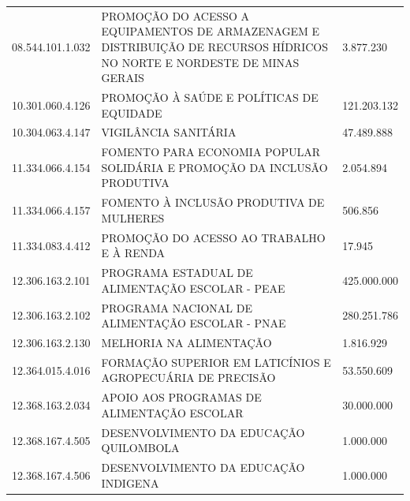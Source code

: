 \documentclass{article}
\begin{document}
\begin{longtable}[c]{m{3cm}|m{12cm}|m{2cm}}
\multicolumn{1}{C{3cm}|}{08.544.101.1.032} & \multicolumn{1}{L{12cm}|}{PROMOÇÃO DO ACESSO A EQUIPAMENTOS DE ARMAZENAGEM E DISTRIBUIÇÃO DE RECURSOS HÍDRICOS NO NORTE E NORDESTE DE MINAS GERAIS} & \multicolumn{1}{R{2cm}}{3.877.230} \\
\multicolumn{1}{C{3cm}|}{10.301.060.4.126} & \multicolumn{1}{L{12cm}|}{PROMOÇÃO À SAÚDE E POLÍTICAS DE EQUIDADE} & \multicolumn{1}{R{2cm}}{121.203.132} \\
\multicolumn{1}{C{3cm}|}{10.304.063.4.147} & \multicolumn{1}{L{12cm}|}{VIGILÂNCIA SANITÁRIA} & \multicolumn{1}{R{2cm}}{47.489.888} \\
\multicolumn{1}{C{3cm}|}{11.334.066.4.154} & \multicolumn{1}{L{12cm}|}{FOMENTO PARA ECONOMIA POPULAR SOLIDÁRIA E PROMOÇÃO DA INCLUSÃO PRODUTIVA} & \multicolumn{1}{R{2cm}}{2.054.894} \\
\multicolumn{1}{C{3cm}|}{11.334.066.4.157} & \multicolumn{1}{L{12cm}|}{FOMENTO À INCLUSÃO PRODUTIVA DE MULHERES} & \multicolumn{1}{R{2cm}}{506.856} \\
\multicolumn{1}{C{3cm}|}{11.334.083.4.412} & \multicolumn{1}{L{12cm}|}{PROMOÇÃO DO ACESSO AO TRABALHO E À RENDA} & \multicolumn{1}{R{2cm}}{17.945} \\
\multicolumn{1}{C{3cm}|}{12.306.163.2.101} & \multicolumn{1}{L{12cm}|}{PROGRAMA ESTADUAL DE ALIMENTAÇÃO ESCOLAR - PEAE} & \multicolumn{1}{R{2cm}}{425.000.000} \\
\multicolumn{1}{C{3cm}|}{12.306.163.2.102} & \multicolumn{1}{L{12cm}|}{PROGRAMA NACIONAL DE ALIMENTAÇÃO ESCOLAR - PNAE} & \multicolumn{1}{R{2cm}}{280.251.786} \\
\multicolumn{1}{C{3cm}|}{12.306.163.2.130} & \multicolumn{1}{L{12cm}|}{MELHORIA NA ALIMENTAÇÃO} & \multicolumn{1}{R{2cm}}{1.816.929} \\
\multicolumn{1}{C{3cm}|}{12.364.015.4.016} & \multicolumn{1}{L{12cm}|}{FORMAÇÃO SUPERIOR EM LATICÍNIOS E AGROPECUÁRIA DE PRECISÃO} & \multicolumn{1}{R{2cm}}{53.550.609} \\
\multicolumn{1}{C{3cm}|}{12.368.163.2.034} & \multicolumn{1}{L{12cm}|}{APOIO AOS PROGRAMAS DE ALIMENTAÇÃO ESCOLAR} & \multicolumn{1}{R{2cm}}{30.000.000} \\
\multicolumn{1}{C{3cm}|}{12.368.167.4.505} & \multicolumn{1}{L{12cm}|}{DESENVOLVIMENTO DA EDUCAÇÃO QUILOMBOLA} & \multicolumn{1}{R{2cm}}{1.000.000} \\
\multicolumn{1}{C{3cm}|}{12.368.167.4.506} & \multicolumn{1}{L{12cm}|}{DESENVOLVIMENTO DA EDUCAÇÃO INDIGENA} & \multicolumn{1}{R{2cm}}{1.000.000} \\

\end{longtable}
\end{document}
